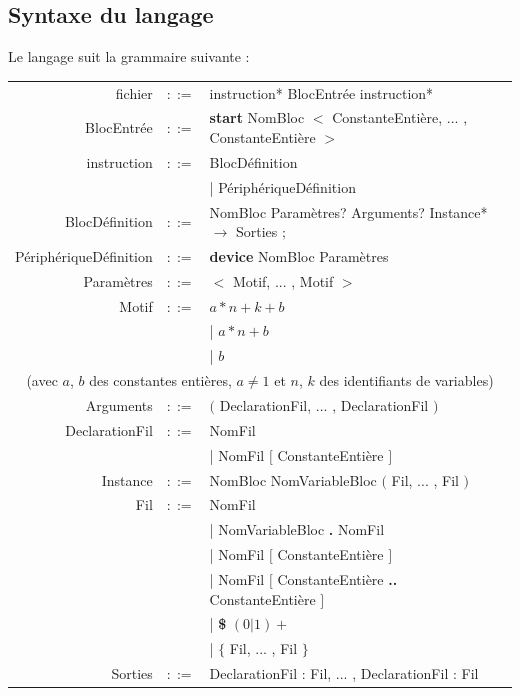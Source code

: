 \documentclass[13pt]{article}
\begin{document}
\subsection{Syntaxe du langage}
Le langage suit la grammaire suivante :\newline\newline
\begin{tabular}{ r c l }
  fichier &$::=$&\: instruction* BlocEntrée instruction*\\ [1.5ex]
  BlocEntrée &$::=$&\: {\bf start} NomBloc $<$ ConstanteEntière, ... ,
  ConstanteEntière  $>$\\ [1.5ex]
  instruction &$::=$&\: BlocDéfinition\\
  &&| PériphériqueDéfinition \\ [1.5ex]
  BlocDéfinition &$::=$&\: NomBloc Paramètres? Arguments? Instance* $\to$
  Sorties $;$\\ [1.5ex]
  PériphériqueDéfinition &$::=$&\: {\bf device} NomBloc Paramètres\\ [1.5ex]
  Paramètres &$::=$&\: $<$ Motif, ... , Motif $>$\\ [1.5ex]
  Motif &$::=$&\: $a*n+k+b$     \\ 
  &&| $a*n+b$  \\ 
  &&| $b$ \\ 
  \multicolumn{3}{c}{(avec $a$, $b$ des constantes entières, $a
    \neq 1$ et $n$, $k$ des identifiants de variables)} \\ [1.5ex]
  Arguments &$::=$&\: $($ DeclarationFil, ... , DeclarationFil $)$ \\ [1.5ex]
  DeclarationFil  &$::=$&\: NomFil \\
  &&| NomFil $[$ ConstanteEntière $]$ \\ [1.5ex]
 
  Instance &$::=$&\: NomBloc NomVariableBloc $($ Fil, ... , Fil $)$ \\ [1.5ex]
  Fil &$::=$&\: NomFil\\
  &&| NomVariableBloc {\bf .} NomFil\\
  &&| NomFil $[$ ConstanteEntière $]$\\
  &&| NomFil $[$ ConstanteEntière {\bf..} ConstanteEntière $]$\\
  &&| {\bf \$} $(0|1)+$ \\
  &&| $\mathbf{\{}$ Fil, ... , Fil $\mathbf{\}}$\\ [1.5ex]
  Sorties&$::=$&\: DeclarationFil : Fil, ... , DeclarationFil : Fil
\end{tabular}
\text{}\\
\end{document}
